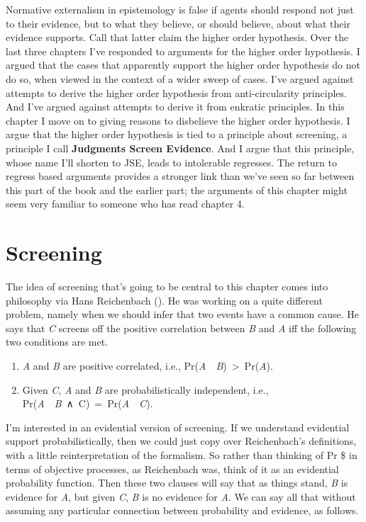 \documentclass[
  10pt,
  letterpaper,
  twoside]{scrbook}
\providecommand{\tightlist}{%
  \setlength{\itemsep}{0pt}\setlength{\parskip}{0pt}}\usepackage{longtable,booktabs,array}
\begin{document}
Normative externalism in epistemology is false if agents should respond
not just to their evidence, but to what they believe, or should believe,
about what their evidence supports. Call that latter claim the higher
order hypothesis. Over the last three chapters I've responded to
arguments for the higher order hypothesis. I argued that the cases that
apparently support the higher order hypothesis do not do so, when viewed
in the context of a wider sweep of cases. I've argued against attempts
to derive the higher order hypothesis from anti-circularity principles.
And I've argued against attempts to derive it from enkratic principles.
In this chapter I move on to giving reasons to disbelieve the higher
order hypothesis. I argue that the higher order hypothesis is tied to a
principle about screening, a principle I call \textbf{Judgments Screen
Evidence}. And I argue that this principle, whose name I'll shorten to
JSE, leads to intolerable regresses. The return to regress based
arguments provides a stronger link than we've seen so far between this
part of the book and the earlier part; the arguments of this chapter
might seem very familiar to someone who has read chapter 4.

\section{Screening}\label{screening}

The idea of screening that's going to be central to this chapter comes
into philosophy via Hans Reichenbach
(). He was working on a quite
different problem, namely when we should infer that two events have a
common cause. He says that \emph{C} screens off the positive correlation
between \emph{B} and \emph{A} iff the following two conditions are met.

\begin{enumerate}
\def\labelenumi{\arabic{enumi}.}
\tightlist
\item
  \emph{A} and \emph{B} are positive correlated, i.e.,
  Pr(\emph{A}~\textbar~\emph{B})~\textgreater~Pr(\emph{A}).
\item
  Given \emph{C}, \emph{A} and \emph{B} are probabilistically
  independent, i.e.,
  Pr(\emph{A}~\textbar~\emph{B}~∧~C)~=~Pr(\emph{A}~\textbar~\emph{C}).
\end{enumerate}

I'm interested in an evidential version of screening. If we understand
evidential support probabilistically, then we could just copy over
Reichenbach's definitions, with a little reinterpretation of the
formalism. So rather than thinking of Pr \$ in terms of objective
processes, as Reichenbach was, think of it as an evidential probability
function. Then these two clauses will say that as things stand, \emph{B}
is evidence for \emph{A}, but given \emph{C}, \emph{B} is no evidence
for \emph{A}. We can say all that without assuming any particular
connection between probability and evidence, as follows.
\end{document}
